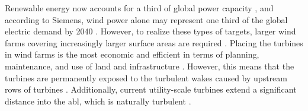 


 











Renewable energy now accounts for a third of global power capacity \cite{RenEnThirty}, and according to Siemens, wind power alone may represent one third of the global electric demand by 2040 \cite{WindThirty}. However, to realize these types of targets, larger wind farms covering increasingly larger surface areas are required \cite{Meyers2012} \cite{Stevens2017}. Placing the turbines in wind farms is the most economic and efficient in terms of planning, maintenance, and use of land and infrastructure \cite{Neunaber}. However, this means that the turbines are permanently exposed to the turbulent wakes caused by upstream rows of turbines \cite{Tossas2014}. Additionally, current utility-scale turbines extend a significant distance into the \gls{abl}, which is naturally turbulent \cite{Neunaber} \cite{Tossas2014}. 


